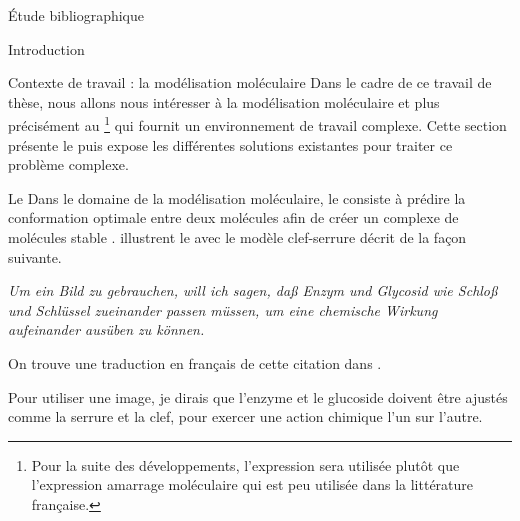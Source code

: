 \documentclass[myfrancais,ngerman,english,frenchb]{mythesis}
\begin{document}
	\begin{mychapter}{Étude bibliographique}
		\begin{mysection}{Introduction}
		\end{mysection}
		\begin{mysection}{Contexte de travail : la modélisation moléculaire}
			Dans le cadre de ce travail de thèse, nous allons nous intéresser à la modélisation moléculaire et plus précisément au \footnote{Pour la suite des développements, l'expression \og {} \fg sera utilisée plutôt que l'expression \og amarrage moléculaire \fg {} qui est peu utilisée dans la littérature française.} qui fournit un environnement de travail complexe.
			Cette section présente le  puis expose les différentes solutions existantes pour traiter ce problème complexe.
			\begin{mysubsection}{Le }
				Dans le domaine de la modélisation moléculaire, le  consiste à prédire la conformation optimale entre deux molécules afin de créer un complexe de molécules stable .
				 illustrent le  avec le modèle \og clef-serrure \fg décrit de la façon suivante.
				\begin{myquote}[ngerman]
					\it Um ein Bild zu gebrauchen, will ich sagen, da\ss{} Enzym und Glycosid wie Schlo\ss{} und Schlüssel zueinander passen müssen, um eine chemische Wirkung aufeinander ausüben zu können.
				\end{myquote}
				On trouve une traduction en français de cette citation dans .
				\begin{myquote}[frenchb]
					Pour utiliser une image, je dirais que l'enzyme et le glucoside doivent être ajustés comme la serrure et la clef, pour exercer une action chimique l'un sur l'autre.
				\end{myquote}


\end{mysubsection}
\end{mysection}
\end{mychapter}
\end{document}
